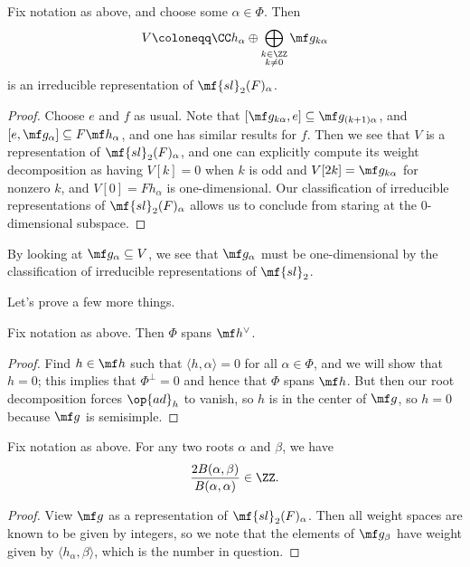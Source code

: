 \documentclass[../notes.tex]{subfiles}
\begin{document}
\begin{lemma}
	Fix notation as above, and choose some $\alpha\in\Phi$. Then
	\[V\coloneqq\CC h_\alpha\oplus\bigoplus_{\substack{k\in\ZZ\\k\ne0}}\mf g_{k\alpha}\]
	is an irreducible representation of $\mf{sl}_2(F)_\alpha$.
\end{lemma}
\begin{proof}
	Choose $e$ and $f$ as usual. Note that $[\mf g_{k\alpha},e]\subseteq\mf g_{(k+1)\alpha}$, and $[e,\mf g_\alpha]\subseteq F\mf h_\alpha$, and one has similar results for $f$. Then we see that $V$ is a representation of $\mf{sl}_2(F)_\alpha$, and one can explicitly compute its weight decomposition as having $V[k]=0$ when $k$ is odd and $V[2k]=\mf g_{k\alpha}$ for nonzero $k$, and $V[0]=Fh_\alpha$ is one-dimensional. Our classification of irreducible representations of $\mf{sl}_2(F)_\alpha$ allows us to conclude from staring at the $0$-dimensional subspace.
\end{proof}
\begin{remark}
	By looking at $\mf g_\alpha\subseteq V$, we see that $\mf g_\alpha$ must be one-dimensional by the classification of irreducible representations of $\mf{sl}_2$.
\end{remark}
Let's prove a few more things.
	
\begin{lemma}
	Fix notation as above. Then $\Phi$ spans $\mf h^\lor$.
\end{lemma}
\begin{proof}
	Find $h\in\mf h$ such that $\langle h,\alpha\rangle=0$ for all $\alpha\in\Phi$, and we will show that $h=0$; this implies that $\Phi^\perp=0$ and hence that $\Phi$ spans $\mf h$. But then our root decomposition forces $\op{ad}_h$ to vanish, so $h$ is in the center of $\mf g$, so $h=0$ because $\mf g$ is semisimple.
\end{proof}
\begin{lemma} \label{lem:almost-reflect}
	Fix notation as above. For any two roots $\alpha$ and $\beta$, we have
	\[\frac{2B(\alpha,\beta)}{B(\alpha,\alpha)}\in\ZZ.\]
\end{lemma}
\begin{proof}
	View $\mf g$ as a representation of $\mf{sl}_2(F)_\alpha$. Then all weight spaces are known to be given by integers, so we note that the elements of $\mf g_\beta$ have weight given by $\langle h_\alpha,\beta\rangle$, which is the number in question.
\end{proof}
\end{document}
